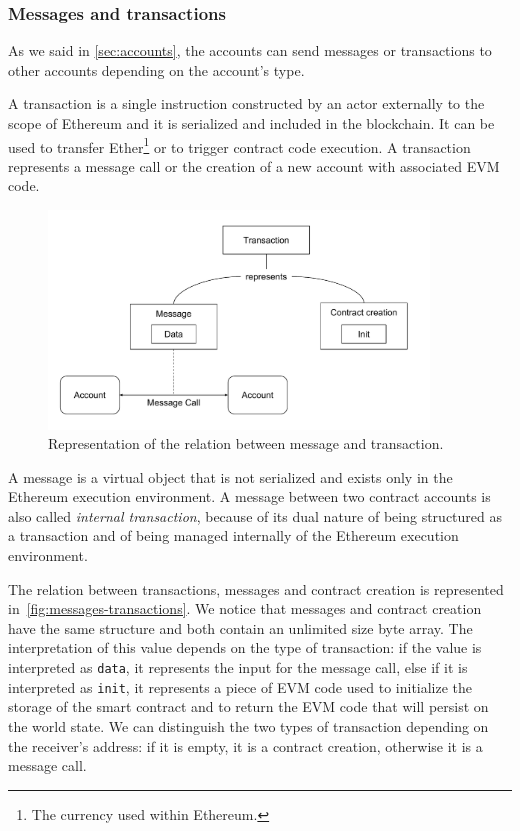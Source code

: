 \subsubsection{Messages and transactions}

As we said in \autoref{sec:accounts}, the accounts can send messages or
transactions to other accounts depending on the account's type.

A transaction is a single instruction constructed by an actor externally to the
scope of Ethereum \cite{wood2018ethereum} and it is serialized and included in
the blockchain. It can be used to transfer Ether\footnote{The currency used
within Ethereum.} or to trigger contract code execution. A transaction
represents a message call or the creation of a new account with associated EVM
code.

\begin{figure}[h]
  \centering
  \includegraphics[width=0.9\textwidth]{./res/img/messages-transactions.pdf}
  \caption{Representation of the relation between message and transaction.}
  \label{fig:messages-transactions}
\end{figure}

A message is a virtual object that is not serialized and exists only in the
Ethereum execution environment. A message between two contract accounts is also
called \emph{internal transaction}, because of its dual nature of being
structured as a transaction and of being managed internally of the Ethereum
execution environment.

The relation between transactions, messages and contract creation is represented
in~\autoref{fig:messages-transactions}. We notice that messages and contract
creation have the same structure and both contain an unlimited size byte array.
The interpretation of this value depends on the type of transaction: if the
value is interpreted as \verb+data+, it represents the input for the message
call, else if it is interpreted as \verb|init|, it represents a piece of EVM
code used to initialize the storage of the smart contract and to return the EVM
code that will persist on the world state. We can distinguish the two types of
transaction depending on the receiver's address: if it is empty, it is a
contract creation, otherwise it is a message call.

